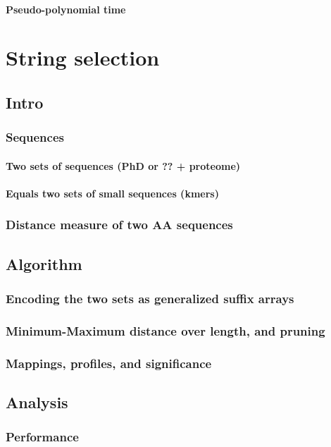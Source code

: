 \documentclass[draft]{memoir}
\begin{document}
   \subsubsection{Pseudo-polynomial time}

\chapter{String selection}

 \section{Intro}
  \subsection{Sequences}
   \subsubsection{Two sets of sequences (PhD or ?? + proteome)}
   \subsubsection{Equals two sets of small sequences (kmers)}
  \subsection{Distance measure of two AA sequences}

 \section{Algorithm}
  \subsection{Encoding the two sets as generalized suffix arrays}
  \subsection{Minimum-Maximum distance over length, and pruning}
  \subsection{Mappings, profiles, and significance}

 \section{Analysis}
  \subsection{Performance}
\end{document}
